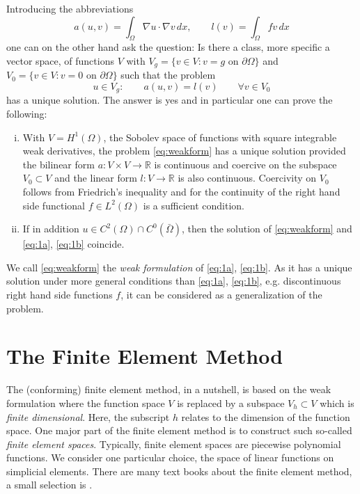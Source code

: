 \documentclass[a4paper,
		     11pt,
		     DIV12,
		     DIVcalc,
		     headings=normal,
		     oneside,
		     bibliography=totoc,
		     headsepline=false,
		     headinclude]{scrartcl}
\begin{document}
Introducing the abbreviations
\begin{equation}
a(u,v) = \int_\Omega \nabla u \cdot \nabla v \,dx, \qquad l(v) = \int_\Omega fv \,dx
\end{equation}
one can on the other hand ask the question: Is there a class,
more specific a vector space, of functions $V$ with $V_g=\{v\in V : 
\text{$v=g$ on $\partial\Omega$}\}$ and $V_0=\{v\in V : 
\text{$v=0$ on $\partial\Omega$}\}$ such that
the problem
\begin{equation}
u \in V_g :\qquad a(u,v) = l(v) \qquad \forall v\in V_0 \label{eq:weakform}
\end{equation}
has a unique solution. The answer is yes and in particular one can prove the following:
\begin{enumerate}[i)]
\item With $V=H^1(\Omega)$, the Sobolev space of functions with square integrable
weak derivatives, the problem \eqref{eq:weakform} has a unique solution provided
the bilinear form $a : V\times V \to \mathbb{R}$ is continuous and coercive on the 
subspace $V_0\subset V$ and the linear form $l: V \to \mathbb{R}$ is also continuous. 
Coercivity on $V_0$ follows from Friedrich's inequality and for the continuity of the right hand
side functional $f\in L^2(\Omega)$ is a sufficient condition.
\item If in addition $u\in C^2(\Omega)\cap C^0(\bar\Omega)$, then the solution
of \eqref{eq:weakform} and \eqref{eq:1a}, \eqref{eq:1b} coincide.
\end{enumerate}
We call \eqref{eq:weakform} the {\em weak formulation} of \eqref{eq:1a}, \eqref{eq:1b}.
As it has a unique solution under more general conditions than \eqref{eq:1a}, \eqref{eq:1b},
e.g. discontinuous right hand side functions $f$, it can be considered as a generalization
of the problem.

\section{The Finite Element Method}

The (conforming) finite element method, in a nutshell, is based on the weak formulation where
the function space $V$ is replaced by a subspace $V_h\subset V$ 
which is {\em finite dimensional}. Here, the subscript $h$ relates to the dimension of the
function space. One major part of the finite element method is to construct such
so-called {\em finite element spaces}.
Typically, finite element spaces are piecewise polynomial functions.
We consider one particular choice, the space of linear functions on simplicial elements.
There are many text books about the finite element method,
a small selection is
\cite{Eriksson,Ern,Ciarlet,Braess,Brenner,Elman2005,GR,WHElliptisch,RannacherII,BastianII}.
\end{document}
